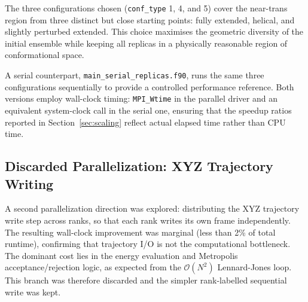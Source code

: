 The three configurations chosen (\texttt{conf\_type} 1, 4, and 5) cover the
near-trans region from three distinct but close starting points: fully
extended, helical, and slightly perturbed extended. This choice maximises the
geometric diversity of the initial ensemble while keeping all replicas in
a physically reasonable region of conformational space.

A serial counterpart, \texttt{main\_serial\_replicas.f90}, runs the same
three configurations sequentially to provide a controlled performance
reference. Both versions employ wall-clock timing: \texttt{MPI\_Wtime} in the
parallel driver and an equivalent system-clock call in the serial one,
ensuring that the speedup ratios reported in Section~\ref{sec:scaling} reflect
actual elapsed time rather than CPU time.

\subsection{Discarded Parallelization: XYZ Trajectory Writing}

A second parallelization direction was explored: distributing the XYZ
trajectory write step across ranks, so that each rank writes its own frame
independently. The resulting wall-clock improvement was marginal (less than
2\% of total runtime), confirming that trajectory I/O is not the computational
bottleneck. The dominant cost lies in the energy evaluation and
Metropolis acceptance/rejection logic, as expected from the
$\mathcal{O}(N^2)$ Lennard-Jones loop. This branch was therefore discarded
and the simpler rank-labelled sequential write was kept.

